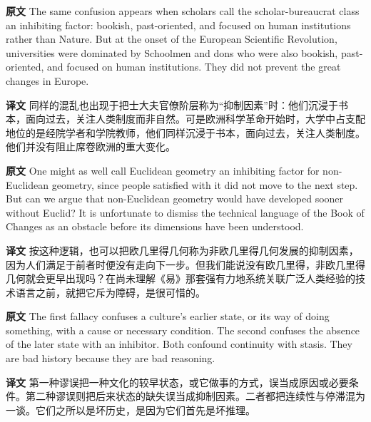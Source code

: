 \documentclass[UTF8,zihao=-4]{ctexart}
\newcommand{\BodyFont}{\fontsize{10.5pt}{15.5pt}\selectfont}
\newcommand{\origlabel}{\textbf{原文}\quad}
\newcommand{\translabel}{\textbf{译文}\quad}
\newenvironment{enblock}{\par\noindent\begingroup\BodyFont\origlabel}{\par\endgroup}
\newenvironment{zhblock}{\par\noindent\begingroup\BodyFont\translabel}{\par\endgroup\vspace{0.35em}}
\begin{document}
\begin{enblock}
The same confusion appears when scholars call the scholar-bureaucrat class an inhibiting factor: bookish, past-oriented, and focused on human institutions rather than Nature. But at the onset of the European Scientific Revolution, universities were dominated by Schoolmen and dons who were also bookish, past-oriented, and focused on human institutions. They did not prevent the great changes in Europe.
\end{enblock}
\begin{zhblock}
同样的混乱也出现于把士大夫官僚阶层称为“抑制因素”时：他们沉浸于书本，面向过去，关注人类制度而非自然。可是欧洲科学革命开始时，大学中占支配地位的是经院学者和学院教师，他们同样沉浸于书本，面向过去，关注人类制度。他们并没有阻止席卷欧洲的重大变化。
\end{zhblock}

\begin{enblock}
One might as well call Euclidean geometry an inhibiting factor for non-Euclidean geometry, since people satisfied with it did not move to the next step. But can we argue that non-Euclidean geometry would have developed sooner without Euclid? It is unfortunate to dismiss the technical language of the Book of Changes as an obstacle before its dimensions have been understood.
\end{enblock}
\begin{zhblock}
按这种逻辑，也可以把欧几里得几何称为非欧几里得几何发展的抑制因素，因为人们满足于前者时便没有走向下一步。但我们能说没有欧几里得，非欧几里得几何就会更早出现吗？在尚未理解《易》那套强有力地系统关联广泛人类经验的技术语言之前，就把它斥为障碍，是很可惜的。
\end{zhblock}

\begin{enblock}
The first fallacy confuses a culture's earlier state, or its way of doing something, with a cause or necessary condition. The second confuses the absence of the later state with an inhibitor. Both confound continuity with stasis. They are bad history because they are bad reasoning.
\end{enblock}
\begin{zhblock}
第一种谬误把一种文化的较早状态，或它做事的方式，误当成原因或必要条件。第二种谬误则把后来状态的缺失误当成抑制因素。二者都把连续性与停滞混为一谈。它们之所以是坏历史，是因为它们首先是坏推理。
\end{zhblock}
\end{document}
